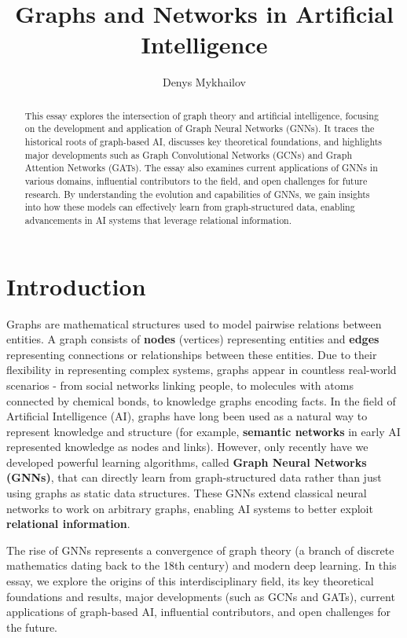 \documentclass{article}
\title{Graphs and Networks in Artificial Intelligence}
\author{Denys Mykhailov}
\begin{document}
\maketitle

\begin{abstract}

      This essay explores the intersection of graph theory and artificial intelligence, focusing on the development and application of Graph Neural Networks (GNNs).
      It traces the historical roots of graph-based AI, discusses key theoretical foundations, and highlights major developments such as Graph Convolutional Networks (GCNs) and Graph Attention Networks (GATs).
      The essay also examines current applications of GNNs in various domains, influential contributors to the field, and open challenges for future research.
      By understanding the evolution and capabilities of GNNs, we gain insights into how these models can effectively learn from graph-structured data, enabling advancements in AI systems that leverage relational information.

\end{abstract}

\section{Introduction}

Graphs are mathematical structures used to model pairwise relations between entities.
A graph consists of \textbf{nodes} (vertices) representing entities and \textbf{edges} representing connections or relationships between these entities.
Due to their flexibility in representing complex systems, graphs appear in countless real-world scenarios - from social networks linking people, to molecules with atoms connected by chemical bonds, to knowledge graphs encoding facts.
In the field of Artificial Intelligence (AI), graphs have long been used as a natural way to represent knowledge and structure (for example, \textbf{semantic networks} in early AI represented knowledge as nodes and links).
However, only recently have we developed powerful learning algorithms, called \textbf{Graph Neural Networks (GNNs)}, that can directly learn from graph-structured data rather than just using graphs as static data structures.
These GNNs extend classical neural networks to work on arbitrary graphs, enabling AI systems to better exploit \textbf{relational information}.

The rise of GNNs represents a convergence of graph theory (a branch of discrete mathematics dating back to the 18th century) and modern deep learning.
In this essay, we explore the origins of this interdisciplinary field, its key theoretical foundations and results, major developments (such as GCNs and GATs), current applications of graph-based AI, influential contributors, and open challenges for the future.
\end{document}

